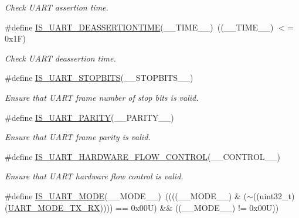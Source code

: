 \begin{DoxyCompactItemize}
\begin{DoxyCompactList}\small\item\em Check U\+A\+RT assertion time. \end{DoxyCompactList}\item 
\#define \hyperlink{group___u_a_r_t___private___macros_ga7e060b24713e3fb49f4f0f4fa71dd85f}{I\+S\+\_\+\+U\+A\+R\+T\+\_\+\+D\+E\+A\+S\+S\+E\+R\+T\+I\+O\+N\+T\+I\+ME}(\+\_\+\+\_\+\+T\+I\+M\+E\+\_\+\+\_\+)~((\+\_\+\+\_\+\+T\+I\+M\+E\+\_\+\+\_\+) $<$= 0x1\+F)
\begin{DoxyCompactList}\small\item\em Check U\+A\+RT deassertion time. \end{DoxyCompactList}\item 
\#define \hyperlink{group___u_a_r_t___private___macros_ga0fa4dec621a59f8c07f42548cdbb7f18}{I\+S\+\_\+\+U\+A\+R\+T\+\_\+\+S\+T\+O\+P\+B\+I\+TS}(\+\_\+\+\_\+\+S\+T\+O\+P\+B\+I\+T\+S\+\_\+\+\_\+)
\begin{DoxyCompactList}\small\item\em Ensure that U\+A\+RT frame number of stop bits is valid. \end{DoxyCompactList}\item 
\#define \hyperlink{group___u_a_r_t___private___macros_ga57b0798bfa43d210f492eb3c5e218a86}{I\+S\+\_\+\+U\+A\+R\+T\+\_\+\+P\+A\+R\+I\+TY}(\+\_\+\+\_\+\+P\+A\+R\+I\+T\+Y\+\_\+\+\_\+)
\begin{DoxyCompactList}\small\item\em Ensure that U\+A\+RT frame parity is valid. \end{DoxyCompactList}\item 
\#define \hyperlink{group___u_a_r_t___private___macros_ga92977d9daf0c39d875df200ae0ae6acd}{I\+S\+\_\+\+U\+A\+R\+T\+\_\+\+H\+A\+R\+D\+W\+A\+R\+E\+\_\+\+F\+L\+O\+W\+\_\+\+C\+O\+N\+T\+R\+OL}(\+\_\+\+\_\+\+C\+O\+N\+T\+R\+O\+L\+\_\+\+\_\+)
\begin{DoxyCompactList}\small\item\em Ensure that U\+A\+RT hardware flow control is valid. \end{DoxyCompactList}\item 
\#define \hyperlink{group___u_a_r_t___private___macros_gae5b637b9191dea1f8fd3846b886dd38b}{I\+S\+\_\+\+U\+A\+R\+T\+\_\+\+M\+O\+DE}(\+\_\+\+\_\+\+M\+O\+D\+E\+\_\+\+\_\+)~((((\+\_\+\+\_\+\+M\+O\+D\+E\+\_\+\+\_\+) \& ($\sim$((uint32\+\_\+t)(\hyperlink{group___u_a_r_t___mode_gab47c162935901e89322e2ce6700b6744}{U\+A\+R\+T\+\_\+\+M\+O\+D\+E\+\_\+\+T\+X\+\_\+\+RX})))) == 0x00\+U) \&\& ((\+\_\+\+\_\+\+M\+O\+D\+E\+\_\+\+\_\+) != 0x00\+U))

\end{DoxyCompactItemize}
